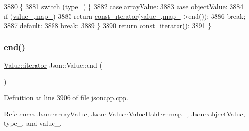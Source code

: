 \begin{DoxyCode}
3880                                      \{
3881   \textcolor{keywordflow}{switch} (\hyperlink{class_json_1_1_value_abd222c2536dc88bf330dedcd076d2356}{type\_}) \{
3882   \textcolor{keywordflow}{case} \hyperlink{namespace_json_a7d654b75c16a57007925868e38212b4eadc8f264f36b55b063c78126b335415f4}{arrayValue}:
3883   \textcolor{keywordflow}{case} \hyperlink{namespace_json_a7d654b75c16a57007925868e38212b4eae8386dcfc36d1ae897745f7b4f77a1f6}{objectValue}:
3884     \textcolor{keywordflow}{if} (\hyperlink{class_json_1_1_value_aef578244546212705b9f81eb84d7e151}{value\_}.\hyperlink{union_json_1_1_value_1_1_value_holder_a1e7a5b86d4f52234f55c847ad1ce389a}{map\_})
3885       \textcolor{keywordflow}{return} \hyperlink{class_json_1_1_value_af92282ca92b58b320debd486afb7696a}{const\_iterator}(\hyperlink{class_json_1_1_value_aef578244546212705b9f81eb84d7e151}{value\_}.\hyperlink{union_json_1_1_value_1_1_value_holder_a1e7a5b86d4f52234f55c847ad1ce389a}{map\_}->end());
3886     \textcolor{keywordflow}{break};
3887   \textcolor{keywordflow}{default}:
3888     \textcolor{keywordflow}{break};
3889   \}
3890   \textcolor{keywordflow}{return} \hyperlink{class_json_1_1_value_af92282ca92b58b320debd486afb7696a}{const\_iterator}();
3891 \}
\end{DoxyCode}
\mbox{\label{class_json_1_1_value_a2f961eff73f7f79cd29260b6cbd42558}} 
\subsubsection{\texorpdfstring{end()}{end()}\hspace{0.1cm}{\footnotesize\ttfamily [2/2]}}
{\footnotesize\ttfamily \hyperlink{class_json_1_1_value_a341cdf2e01f8b3c5b7317aa2f0768c53}{Value\+::iterator} Json\+::\+Value\+::end (\begin{DoxyParamCaption}{ }\end{DoxyParamCaption})}



Definition at line 3906 of file jsoncpp.\+cpp.



References Json\+::array\+Value, Json\+::\+Value\+::\+Value\+Holder\+::map\+\_\+, Json\+::object\+Value, type\+\_\+, and value\+\_\+.


